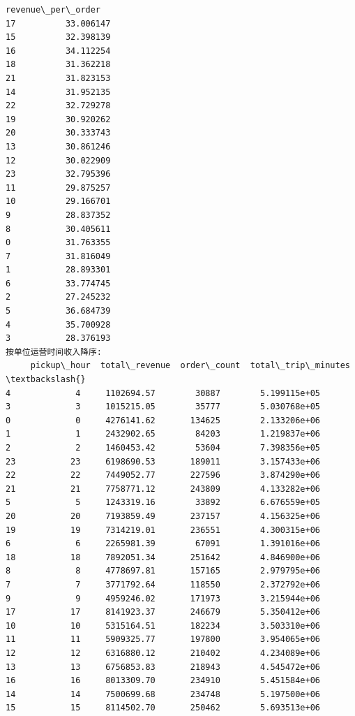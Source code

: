 \documentclass[11pt]{article}
\begin{document}
\begin{Verbatim}[commandchars=\\\{\}]
    revenue\_per\_order
17          33.006147
15          32.398139
16          34.112254
18          31.362218
21          31.823153
14          31.952135
22          32.729278
19          30.920262
20          30.333743
13          30.861246
12          30.022909
23          32.795396
11          29.875257
10          29.166701
9           28.837352
8           30.405611
0           31.763355
7           31.816049
1           28.893301
6           33.774745
2           27.245232
5           36.684739
4           35.700928
3           28.376193
按单位运营时间收入降序:
     pickup\_hour  total\_revenue  order\_count  total\_trip\_minutes  \textbackslash{}
4             4     1102694.57        30887        5.199115e+05
3             3     1015215.05        35777        5.030768e+05
0             0     4276141.62       134625        2.133206e+06
1             1     2432902.65        84203        1.219837e+06
2             2     1460453.42        53604        7.398356e+05
23           23     6198690.53       189011        3.157433e+06
22           22     7449052.77       227596        3.874290e+06
21           21     7758771.12       243809        4.133282e+06
5             5     1243319.16        33892        6.676559e+05
20           20     7193859.49       237157        4.156325e+06
19           19     7314219.01       236551        4.300315e+06
6             6     2265981.39        67091        1.391016e+06
18           18     7892051.34       251642        4.846900e+06
8             8     4778697.81       157165        2.979795e+06
7             7     3771792.64       118550        2.372792e+06
9             9     4959246.02       171973        3.215944e+06
17           17     8141923.37       246679        5.350412e+06
10           10     5315164.51       182234        3.503310e+06
11           11     5909325.77       197800        3.954065e+06
12           12     6316880.12       210402        4.234089e+06
13           13     6756853.83       218943        4.545472e+06
16           16     8013309.70       234910        5.451584e+06
14           14     7500699.68       234748        5.197500e+06
15           15     8114502.70       250462        5.693513e+06


\end{Verbatim}
\end{document}
